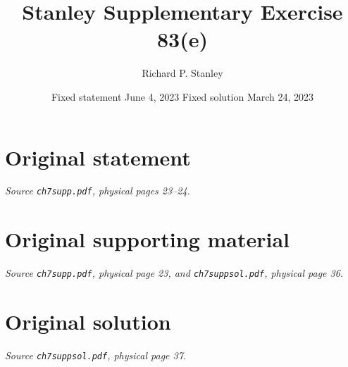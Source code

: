 \documentclass[11pt,a4paper]{article}
\author{Richard P. Stanley}
\date{Fixed statement June 4, 2023 \qquad Fixed solution March 24, 2023}
\title{Stanley Supplementary Exercise 83(e)}
\begin{document}
\maketitle
\section*{Original statement}
\noindent\emph{Source \texttt{ch7supp.pdf}, physical pages 23--24.}\par\medskip

\clearpage
\section*{Original supporting material}
\noindent\emph{Source \texttt{ch7supp.pdf}, physical page 23, and \texttt{ch7suppsol.pdf}, physical page 36.}\par\medskip

\clearpage
\section*{Original solution}
\noindent\emph{Source \texttt{ch7suppsol.pdf}, physical page 37.}\par\medskip

\end{document}
